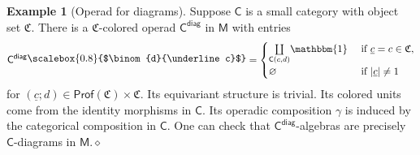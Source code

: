 \documentclass[11pt]{amsbook}
\numberwithin{section}{chapter}
\numberwithin{subsection}{section}
\numberwithin{equation}{section}
\theoremstyle{plain}
\theoremstyle{definition}
\newtheorem{example}[equation]{Example}
\newcommand{\colorc}{\mathfrak{C}}
\newcommand{\Prof}{\mathsf{Prof}}
\newcommand{\Profc}{\Prof(\colorc)}
\newcommand{\Profcc}{\Profc \times \colorc}
\newcommand{\C}{\mathsf{C}}
\newcommand{\M}{\mathsf{M}}
\newcommand{\tensorunit}{\mathbbm{1}}
\newcommand{\coprodover}[1]{\underset{#1}{\coprod}}
\newcommand{\dqed}{\hfill$\diamond$}
\newcommand{\Cdiag}{\C^{\mathsf{diag}}}
\newcommand{\uc}{\underline c}
\newcommand{\smallprof}[1]
{\raisebox{.05cm}{\scalebox{0.8}{#1}}}
\newcommand{\duc}{\smallprof{$\binom{d}{\uc}$}}
\begin{document}
\begin{example}[Operad for diagrams]\label{ex:operad-diag}
Suppose $\C$ is a small category with object set $\colorc$.  There is a $\colorc$-colored operad $\Cdiag$ in $\M$ with entries
\[\Cdiag\duc = \begin{cases} \coprodover{\C(c,d)}\tensorunit & \text{ if $\uc=c \in \colorc$},\\ \varnothing & \text{ if $|\uc|\not=1$}\end{cases}\]
for $(\uc;d) \in \Profcc$.  Its equivariant structure is trivial.  Its colored units come from the identity morphisms in $\C$.  Its operadic composition $\gamma$ is induced by the categorical composition in $\C$.  One can check that $\Cdiag$-algebras are precisely $\C$-diagrams in $\M$.\dqed
\end{example}
\end{document}
